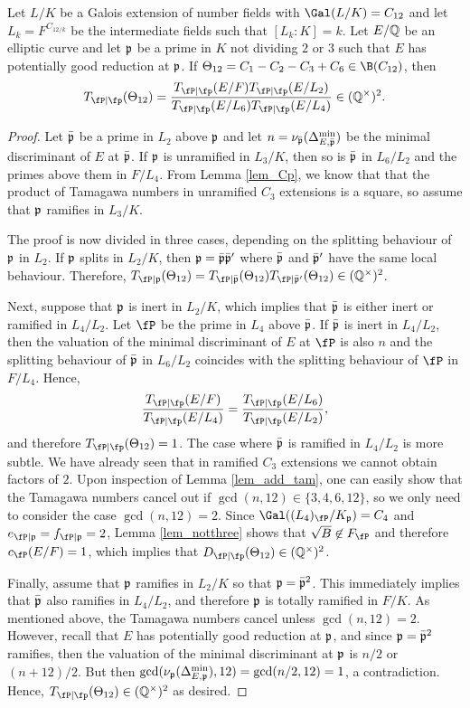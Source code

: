 \begin{lemma}
    Let $L/K$ be a Galois extension of number fields with $\Gal(L/K)=C_{12}$ and let $L_k=F^{C_{12/k}}$ be the intermediate fields such that $[L_k:K]=k$. Let $E/\mathbb{Q}$ be an elliptic curve and let $\mathfrak{p}$ be a prime in $K$ not dividing $2$ or $3$ such that $E$ has potentially good reduction at $\mathfrak{p}$. If $\Theta_{12}=C_1-C_2-C_3+C_6\in \B(C_{12})$, then $$\Tp(\Theta_{12})=\frac{\Tp(E/F)\Tp(E/L_2)}{\Tp(E/L_6)\Tp(E/L_4)}\in\QQss.$$
\end{lemma}
\begin{proof}
    Let $\bar{\mathfrak{p}}$ be a prime in $L_2$ above $\mathfrak{p}$ and let $n=\nu_{\bar{\mathfrak{p}}}(\Delta_{E,\bar{\mathfrak{p}}}^{\min})$ be the minimal discriminant of $E$ at $\bar{\mathfrak{p}}$. If $\mathfrak{p}$ is unramified in $L_3/K$, then so is $\bar{\mathfrak{p}}$ in $L_6/L_2$ and the primes above them in $F/L_4$. From Lemma \ref{lem_Cp}, we know that that the product of Tamagawa numbers in unramified $C_3$ extensions is a square, so assume that $\mathfrak{p}$ ramifies in $L_3/K$.

    The proof is now divided in three cases, depending on the splitting behaviour of $\mathfrak{p}$ in $L_2$. If $\mathfrak{p}$ splits in $L_2/K$, then $\mathfrak{p}=\bar{\mathfrak{p}}\bar{\mathfrak{p}}'$ where $\bar{\mathfrak{p}}$ and $\bar{\mathfrak{p}}'$ have the same local behaviour. Therefore, $T_{\fP\mid\pp}(\Theta_{12})=T_{\fP\mid\bar\pp}(\Theta_{12})T_{\fP\mid\bar\pp'}(\Theta_{12})\in\QQss$. 
    
    Next, suppose that $\mathfrak{p}$ is inert in $L_2/K$, which implies that $\bar{\mathfrak{p}}$ is either inert or ramified in $L_4/L_2$. Let $\fP$ be the prime in $L_4$ above $\bar{\mathfrak{p}}$. If $\bar{\mathfrak{p}}$ is inert in $L_4/L_2$, then the valuation of the minimal discriminant of $E$ at $\fP$ is also $n$ and the splitting behaviour of $\bar{\mathfrak{p}}$ in $L_6/L_2$ coincides with the splitting behaviour of $\fP$ in $F/L_4$. Hence, 
    $$\frac{\Tp(E/F)}{\Tp(E/L_4)}=\frac{\Tp(E/L_6)}{\Tp(E/L_2)},$$
    and therefore $\Tp(\Theta_{12})=1$. The case where $\bar{\mathfrak{p}}$ is ramified in $L_4/L_2$ is more subtle. We have already seen that in ramified $C_3$ extensions we cannot obtain factors of $2$. Upon inspection of Lemma \ref{lem_add_tam}, one can easily show that the Tamagawa numbers cancel out if $\gcd(n,12)\in\{3,4,6,12\}$, so we only need to consider the case $\gcd(n,12)=2$. Since $\Gal((L_4)_\fP/K_\pp)=C_4$ and $e_{\fP\mid\pp}=f_{\fP\mid\pp}=2$, Lemma \ref{lem_notthree} shows that $\sqrt{B}\not\in F_{\fP}$ and therefore $c_\fP(E/F)=1$, which implies that $\Dp(\Theta_{12})\in\QQss$.

    Finally, assume that $\mathfrak{p}$ ramifies in $L_2/K$ so that $\mathfrak{p}=\bar{\mathfrak{p}}^2$. This immediately implies that $\bar{\mathfrak{p}}$ also ramifies in $L_4/L_2$, and therefore $\mathfrak{p}$ is totally ramified in $F/K$. As mentioned above, the Tamagawa numbers cancel unless $\gcd(n,12)=2$. However, recall that $E$ has potentially good reduction at $\mathfrak{p}$, and since $\mathfrak{p}=\bar{\mathfrak{p}}^2$ ramifies, then the valuation of the minimal discriminant at $\mathfrak{p}$ is $n/2$ or $(n+12)/2$. But then $\gcd(\nu_{\mathfrak{p}}(\Delta_{E,\mathfrak{p}}^{\min}),12)=\gcd(n/2,12)=1$, a contradiction. Hence, $\Tp(\Theta_{12})\in\QQss$ as desired.
\end{proof}

